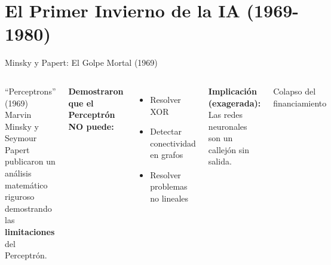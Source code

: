\documentclass[aspectratio=169]{beamer}
\begin{document}
\section{El Primer Invierno de la IA (1969-1980)}

\begin{frame}{Minsky y Papert: El Golpe Mortal (1969)}
    \begin{columns}
        \begin{alertblock}{``Perceptrons'' (1969)}
            Marvin Minsky y Seymour Papert publicaron un análisis matemático riguroso demostrando las \textbf{limitaciones} del Perceptrón.
        \end{alertblock}
        
        \vspace{0.3cm}
        \textbf{Demostraron que el Perceptrón NO puede:}
        \begin{itemize}
            \item Resolver XOR
            \item Detectar conectividad en grafos
            \item Resolver problemas no lineales
        \end{itemize}
        
        \vspace{0.3cm}
        \textbf{Implicación (exagerada):} Las redes neuronales son un callejón sin salida.
        
        \centering
        
        \vspace{0.2cm}
        \scriptsize Colapso del financiamiento
    \end{columns}
\end{frame}
\end{document}
